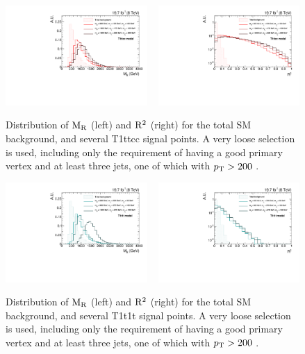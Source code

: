 \begin{figure}[htpb]
\centering
\includegraphics[width=0.48\textwidth]{figures/razor_variables/T1ttcc_MR_comparison} 
~
\includegraphics[width=0.48\textwidth]{figures/razor_variables/T1ttcc_R2_comparison}
\caption{Distribution of $\mathrm{M_R}$ (left) and $\mathrm{R^2}$ (right) for the total SM background, and several
T1ttcc signal points. A very loose selection is used, including only the requirement of having a
good primary vertex and at least three jets, one of which with $p_{\mathrm{T}} > 200$ \GeV. 
\label{fig:razor_MR_R2_T1ttcc}}
\end{figure}

\begin{figure}[htpb]
\centering
\includegraphics[width=0.48\textwidth]{figures/razor_variables/T1t1t_MR_comparison} 
~
\includegraphics[width=0.48\textwidth]{figures/razor_variables/T1t1t_R2_comparison}
\caption{Distribution of $\mathrm{M_R}$ (left) and $\mathrm{R^2}$ (right) for the total SM background, and several
T1t1t signal points. A very loose selection is used, including only the requirement of having a good
primary vertex and at least three jets, one of which with $p_{\mathrm{T}} > 200$ \GeV. 
\label{fig:razor_MR_R2_T1t1t}}
\end{figure}

